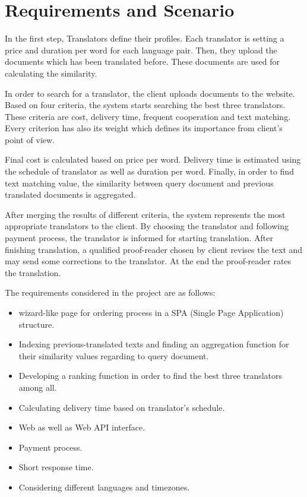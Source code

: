 \section{Requirements and Scenario}
In the first step, Translators define their profiles. Each translator is setting a price and duration per word for each language pair. Then, they upload the documents which has been translated before. These documents are used for calculating the similarity.

In order to search for a translator, the client uploads documents to the website. Based on four criteria, the system starts searching the best three translators. These criteria are cost, delivery time, frequent cooperation and text matching. Every criterion has also its weight which defines its importance from client's point of view.

Final cost is calculated based on price per word. Delivery time is estimated using the schedule of translator as well as duration per word. Finally, in order to find text matching value, the similarity between query document and previous translated documents is aggregated.

After merging the results of different criteria, the system represents the most appropriate translators to the client. By choosing the translator and following payment process, the translator is informed for starting translation. After finishing translation, a qualified proof-reader chosen by client revises the text and may send some corrections to the translator. At the end the proof-reader rates the translation. 

The requirements considered in the project are as follows:
\begin{itemize}
	\item wizard-like page for ordering process in a SPA (Single Page Application) structure.
	\item Indexing previous-translated texts and finding an aggregation function for their similarity values regarding to query document.
	\item Developing a ranking function in order to find the best three translators among all.
	\item Calculating delivery time based on translator's schedule.
	\item Web as well as Web API interface.
	\item Payment process.
	\item Short response time.
	\item Considering different languages and timezones.
\end{itemize}